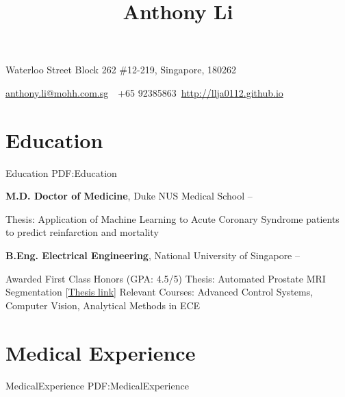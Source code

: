 \documentclass[letterpaper,10pt,oneside]{article}
\newcommand{\CVAuthor}{Anthony Li}
\newcommand{\CVWebpage}{http://llja0112.github.io}
\begin{document}

\title{\CVAuthor}

\begin{subtitle}
{Waterloo Street Block 262 \#12-219, Singapore, 180262}
\par
\href{mailto:anthony.li@mohh.com.sg}
{anthony.li@mohh.com.sg}
\,\SubBulletSymbol\,
+65 92385863\,
\href{\CVWebpage}
{\CVWebpage}
\end{subtitle}

\begin{body}


\section
{Education}
{Education}
{PDF:Education}

{\textbf{M.D. Doctor of Medicine}, Duke NUS Medical School}
\hfill
{} -- 

\GapNoBreak
\BulletItem
Thesis: Application of Machine Learning to Acute Coronary Syndrome patients to predict 
\newline reinfarction and mortality

\BigGap
{\textbf{B.Eng. Electrical Engineering}, National University of Singapore}
\hfill
{} --

\GapNoBreak
\BulletItem
Awarded First Class Honors (GPA: 4.5/5)
\BulletItem
Thesis: Automated Prostate MRI Segmentation [\href{https://drive.google.com/open?id=0B1GfPKwMcZtpdWp0aUpxMnlKbU1oLVJFbjN3bGwwcXZlVVNJ}{Thesis link}]
\BulletItem
Relevant Courses: Advanced Control Systems, Computer Vision, Analytical Methods in ECE

\section
{Medical Experience}
{MedicalExperience}
{PDF:MedicalExperience}


\end{body}
\end{document}
